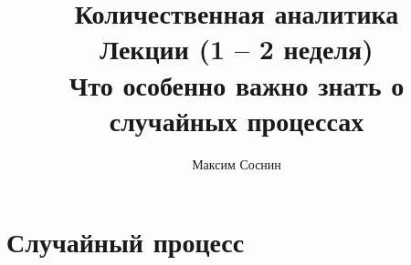 \documentclass{article}
\title{Количественная аналитика\\
Лекции (1 -- 2 неделя) \\
Что особенно важно знать о случайных процессах
}
\author{Максим Соснин}
\begin{document}
\maketitle

\setcounter{tocdepth}{2} %
\renewcommand\contentsname{Содержание}
\tableofcontents
\newpage




\newcommand{\E}{\textrm{E}}
\newcommand\eqannot[1]{\stackrel{\mathclap{\normalfont\mbox{#1}}}{=}}

\section{Случайный процесс}
\end{document}
